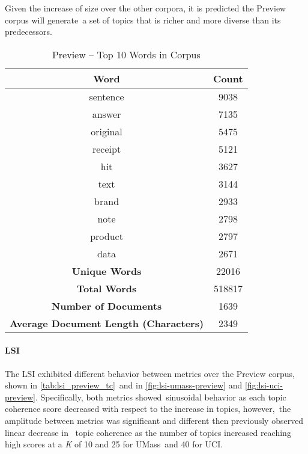 \documentclass[letterpaper,12pt]{article}
\begin{document}
Given the increase of size over the other corpora, it is predicted the Preview corpus will generate\
a set of topics that is richer and more diverse than its predecessors.

\begin{table}
	\caption{\label{tab:preview_top_words} Preview -- Top 10 Words in Corpus}
	\begin{center}
		\begin{tabular}{|c|c|}
			\hline
			\textbf{Word} & \textbf{Count} \\
			\hline
			sentence & 9038 \\
			\hline
			answer & 7135 \\
			\hline
			original & 5475 \\
			\hline
			receipt & 5121 \\
			\hline
			hit & 3627 \\
			\hline
			text & 3144 \\
			\hline
			brand & 2933 \\
			\hline
			note & 2798 \\
			\hline
			product & 2797 \\
			\hline
			data & 2671 \\
			\hline
			\textbf{Unique Words} & 22016 \\
			\hline
			\textbf{Total Words} & 518817 \\
			\hline
			\textbf{Number of Documents} & 1639 \\
			\hline
			\textbf{Average Document Length (Characters)} & 2349 \\
			\hline
		\end{tabular}
	\end{center}
\end{table}



\newpage
\paragraph{LSI}
The LSI exhibited different behavior between metrics over the Preview corpus, shown in \ref{tab:lsi_preview_tc}\
and in \ref{fig:lsi-umass-preview} and \ref{fig:lsi-uci-preview}. Specifically, both metrics showed\
sinusoidal behavior as each topic coherence score decreased with respect to the increase in topics, however,\
the amplitude between metrics was significant and different then previously observed linear decrease in \
topic coherence as the number of topics increased reaching high scores at a \emph{K} of 10 and 25 for UMass\
and 40 for UCI. 
\end{document}

